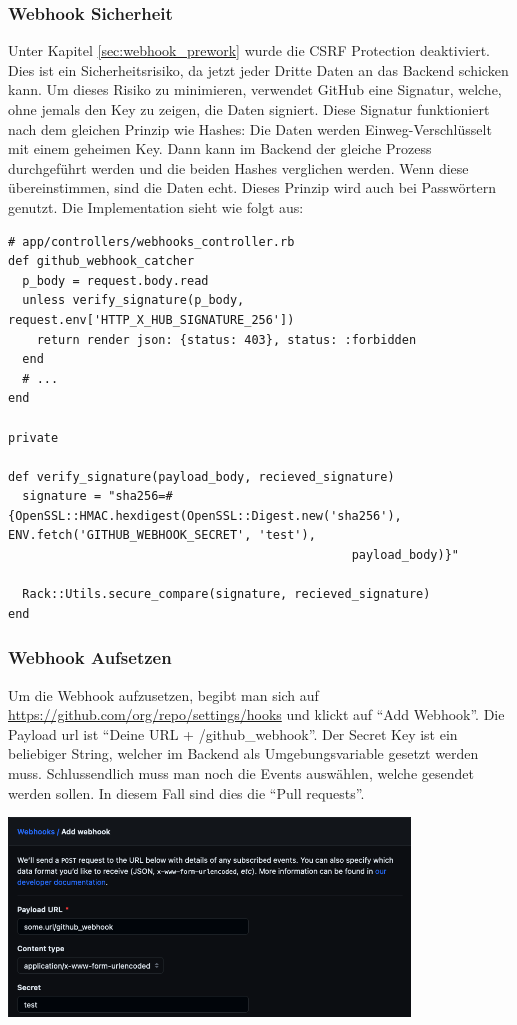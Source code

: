 \subsubsection{Webhook Sicherheit}
Unter Kapitel \ref{sec:webhook_prework} wurde die CSRF Protection deaktiviert. Dies ist ein Sicherheitsrisiko, da
jetzt jeder Dritte Daten an das Backend schicken kann. Um dieses Risiko zu minimieren, verwendet GitHub eine Signatur,
welche, ohne jemals den Key zu zeigen, die Daten signiert. Diese Signatur funktioniert nach dem gleichen Prinzip wie
Hashes: Die Daten werden Einweg-Verschlüsselt mit einem geheimen Key. Dann kann im Backend der gleiche Prozess 
durchgeführt werden und die beiden Hashes verglichen werden. Wenn diese übereinstimmen, sind die Daten echt. Dieses
Prinzip wird auch bei Passwörtern genutzt. \cite{password_storage} \newline
Die Implementation sieht wie folgt aus:
\begin{codebox}[]
  \begin{verbatim}
# app/controllers/webhooks_controller.rb
def github_webhook_catcher
  p_body = request.body.read
  unless verify_signature(p_body, request.env['HTTP_X_HUB_SIGNATURE_256'])
    return render json: {status: 403}, status: :forbidden
  end
  # ...
end

private

def verify_signature(payload_body, recieved_signature)
  signature = "sha256=#{OpenSSL::HMAC.hexdigest(OpenSSL::Digest.new('sha256'), ENV.fetch('GITHUB_WEBHOOK_SECRET', 'test'),
                                                payload_body)}"

  Rack::Utils.secure_compare(signature, recieved_signature)
end
  \end{verbatim}
\end{codebox}

\subsubsection{Webhook Aufsetzen}
Um die Webhook aufzusetzen, begibt man sich auf \url{https://github.com/org/repo/settings/hooks} und klickt auf
\enquote{Add Webhook}. Die Payload url ist \enquote{Deine URL + /github\_webhook}. Der Secret Key ist ein beliebiger
String, welcher im Backend als Umgebungsvariable gesetzt werden muss. Schlussendlich muss man noch die Events
auswählen, welche gesendet werden sollen. In diesem Fall sind dies die \enquote{Pull requests}.
\begin{center}
  \includegraphics[width=0.8\textwidth]{images/misc/setup_webhook.png}
  \label{fig:github_webhook}
\end{center}

